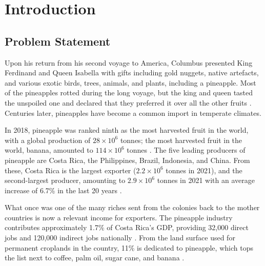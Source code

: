 \chapter{Introduction}






\section{Problem Statement}

Upon his return from his second voyage to America, Columbus presented King Ferdinand and Queen Isabella with gifts including gold nuggets, native artefacts, and various exotic birds, trees, animals, and plants, including a pineapple. Most of the pineapples rotted during the long voyage, but the king and queen tasted the unspoiled one and declared that they preferred it over all the other fruits \citep{o2013pineapple}. Centuries later, pineapples have become a common import in temperate climates. 

In 2018, pineapple was ranked ninth as the most harvested fruit in the world, with a global production of $28 \times 10^6$ tonnes; the most harvested fruit in the world, banana, amounted to $114 \times 10^6$ tonnes \citep{fruit2020international}. The five leading producers of pineapple are Costa Rica, the Philippines, Brazil, Indonesia, and China. From these, Costa Rica is the largest exporter ($2.2 \times 10^6$ tonnes in 2021), and the second-largest producer, amounting to $2.9 \times 10^6$ tonnes in 2021 with an average increase of 6.7\% in the last 20 years \citep{FAOSTAT2022}. 

What once was one of the many riches sent from the colonies back to the mother countries is now a relevant income for exporters. The pineapple industry contributes approximately 1.7\% of Costa Rica's GDP, providing 32,000 direct jobs and 120,000 indirect jobs nationally \citep{chen2020production, employmentCR}. From the land surface used for permanent croplands in the country, 11\% is dedicated to pineapple, which tops the list next to coffee, palm oil, sugar cane, and banana \citep{cenagro2014}. 

